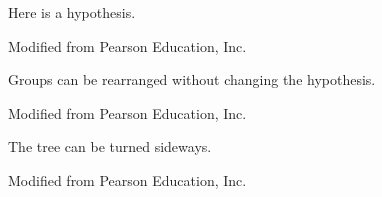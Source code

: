 \documentclass[t]{beamer}
\begin{document}
%
{
\begin{frame}[b]{Here is a hypothesis.}

\tiny Modified from \textcopyright Pearson Education, Inc.
\end{frame}
}
%
%
{
\begin{frame}[b]{Groups can be rearranged without changing the hypothesis.}

\tiny Modified from \textcopyright Pearson Education, Inc.
\end{frame}
}
%
%
{
\begin{frame}[b]{The tree can be turned sideways.}

\tiny Modified from \textcopyright Pearson Education, Inc.
\end{frame}
}
%
\end{document}
